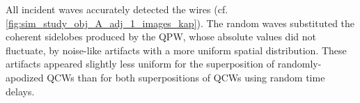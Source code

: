 All incident waves accurately detected
the wires
(cf. \cref{fig:sim_study_obj_A_adj_1_images_kap}).
The random waves substituted
the coherent sidelobes produced by
the \ac{QPW}, whose
absolute values did not fluctuate, by
noise-like artifacts with
a more uniform spatial distribution.
These artifacts appeared
slightly less uniform for
the superposition of
randomly-apodized \acp{QCW} than for
both superpositions of
\acp{QCW} using
random time delays.
